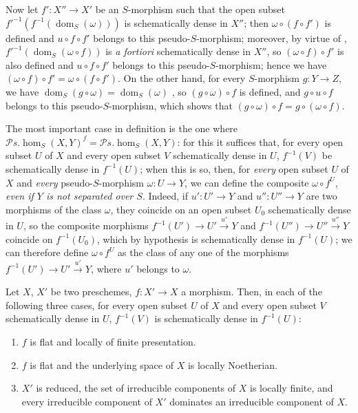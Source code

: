 \begin{env}[20.3.3]
\label{IV.20.3.3}
Now let $f':X''\to X'$ be an $S$-morphism such that the open subset $f'^{-1}(f^{-1}(\operatorname{dom}_S(\omega)))$ is schematically dense in $X''$; then $\omega\circ(f\circ f')$ is defined and $u\circ f\circ f'$ belongs to this pseudo-$S$-morphism; moreover, by virtue of , $f'^{-1}(\operatorname{dom}_S(\omega\circ f))$ is \emph{a fortiori} schematically dense in $X''$, so $(\omega\circ f)\circ f'$ is also defined and $u\circ f\circ f'$ belongs to this pseudo-$S$-morphism; hence we have $(\omega\circ f)\circ f'=\omega\circ(f\circ f')$.
On the other hand, for every $S$-morphism $g:Y\to Z$, we have $\operatorname{dom}_S(g\circ\omega)=\operatorname{dom}_S(\omega)$ , so $(g\circ\omega)\circ f$ is defined, and $g\circ u\circ f$ belongs to this pseudo-$S$-morphism, which shows that $(g\circ\omega)\circ f=g\circ(\omega\circ f)$.
\end{env}

\begin{env}[20.3.4]
\label{IV.20.3.4}
The most important case in definition  is the one where $\mathscr{P}\!s.\!\operatorname{hom}_S(X,Y)^f=\mathscr{P}\!s.\!\operatorname{hom}_S(X,Y)$: for this it suffices that, for every open subset $U$ of $X$ and every open subset $V$ schematically dense in $U$, $f^{-1}(V)$ be schematically dense in $f^{-1}(U)$; when this is so, then, for \emph{every} open subset $U$ of $X$ and \emph{every} pseudo-$S$-morphism $\omega:U\to Y$, we can define the composite $\omega\circ f^U$, \emph{even if $Y$ is not separated over $S$}.
Indeed, if $u':U'\to Y$ and $u'':U''\to Y$ are two morphisms of the class $\omega$, they coincide on an open subset $U_0$ schematically dense in $U$, so the composite morphisms $f^{-1}(U')\to U'\xrightarrow{u'}Y$ and $f^{-1}(U'')\to U''\xrightarrow{u''}Y$ coincide on $f^{-1}(U_0)$, which by hypothesis is schematically dense in $f^{-1}(U)$; we can therefore define $\omega\circ f^U$ as the class of any one of the morphisms $f^{-1}(U')\to U'\xrightarrow{u'}Y$, where $u'$ belongs to $\omega$.
\end{env}

\begin{proposition}[20.3.5]\label{IV.20.3.5}
Let $X$, $X'$ be two preschemes, $f:X'\to X$ a morphism.
Then, in each of the following three cases, for every open subset $U$ of $X$ and every open subset $V$ schematically dense in $U$, $f^{-1}(V)$ is schematically dense in $f^{-1}(U)$:
\begin{enumerate}[label=\emph{(\roman*)}]
  \item $f$ is flat and locally of finite presentation.
  \item $f$ is flat and the underlying space of $X$ is locally Noetherian.
  \item $X'$ is reduced, the set of irreducible components of $X$ is locally finite, and every irreducible component of $X'$ dominates an irreducible component of $X$.
\end{enumerate}
\end{proposition}


